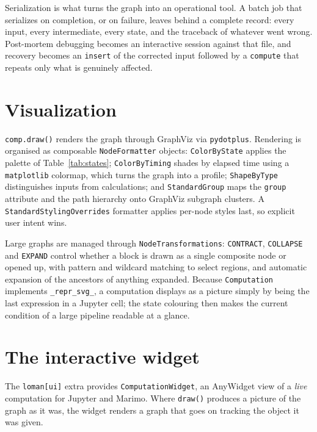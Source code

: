 \documentclass[11pt,a4paper]{article}
\newcommand{\code}[1]{\texttt{#1}}
\begin{document}
Serialization is what turns the graph into an operational tool. A batch job
that serializes on completion, or on failure, leaves behind a complete record:
every input, every intermediate, every state, and the traceback of whatever
went wrong. Post-mortem debugging becomes an interactive session against that
file, and recovery becomes an \code{insert} of the corrected input followed by a
\code{compute} that repeats only what is genuinely affected.

\section{Visualization}\label{sec:viz}

\code{comp.draw()} renders the graph through GraphViz via \code{pydotplus}.
Rendering is organised as composable \code{NodeFormatter} objects:
\code{ColorByState} applies the palette of Table~\ref{tab:states};
\code{ColorByTiming} shades by elapsed time using a \code{matplotlib}
\cite{matplotlib} colormap, which turns the graph into a profile;
\code{ShapeByType} distinguishes inputs from calculations; and
\code{StandardGroup} maps the \code{group} attribute and the path hierarchy onto
GraphViz subgraph clusters. A \code{StandardStylingOverrides} formatter applies
per-node styles last, so explicit user intent wins.

Large graphs are managed through \code{NodeTransformations}: \code{CONTRACT},
\code{COLLAPSE} and \code{EXPAND} control whether a block is drawn as a single
composite node or opened up, with pattern and wildcard matching to select
regions, and automatic expansion of the ancestors of anything expanded.
Because \code{Computation} implements \code{\_repr\_svg\_}, a computation
displays as a picture simply by being the last expression in a Jupyter cell;
the state colouring then makes the current condition of a large pipeline
readable at a glance.

\section{The interactive widget}\label{sec:ui}

The \code{loman[ui]} extra provides \code{ComputationWidget}, an AnyWidget view
of a \emph{live} computation for Jupyter and Marimo. Where \code{draw()}
produces a picture of the graph as it was, the widget renders a graph that goes
on tracking the object it was given.
\end{document}
